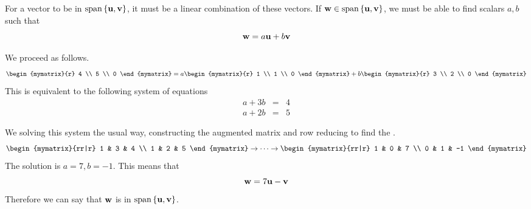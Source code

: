 \begin{solution}
  For a vector to be in $\sspan \set{\vect{u}, \vect{v} }$, it must be a linear combination of these vectors. If $\vect{w} \in \sspan \set{\vect{u}, \vect{v} }$, we must be able to find scalars $a,b$ such that\[
    \mbox{\bf w} = a \mbox{\bf u} +b \mbox{\bf v}
  \]

  We proceed as follows.
  \[
    \begin{mymatrix}{r}
      4 \\
      5 \\
      0
    \end{mymatrix}
    =
    a 
    \begin{mymatrix}{r}
      1 \\
      1 \\
      0
    \end{mymatrix}
    +
    b
    \begin{mymatrix}{r}
      3 \\
      2 \\
      0
    \end{mymatrix}
  \]
  This is equivalent to the following system of equations
  \begin{eqnarray*}
    a + 3b &=& 4 \\
    a + 2b &=& 5
  \end{eqnarray*}

  We solving this system the usual way, constructing the augmented matrix and row reducing to find the {\rref}.
  \[
    \begin{mymatrix}{rr|r}
      1 & 3 & 4 \\
      1 & 2 & 5 
    \end{mymatrix}
    \rightarrow \cdots \rightarrow
    \begin{mymatrix}{rr|r}
      1 & 0 & 7 \\
      0 & 1 & -1
    \end{mymatrix}
  \]
  The solution is $a=7, b=-1$. This means that 
  \[
    \mbox{\bf w} = 7 \mbox{\bf u} - \mbox{\bf v}
  \] 
  Therefore we can say that $\mbox{\bf w}$ is in $\sspan \set{\vect{u}, \vect{v} }$. 
\end{solution}
